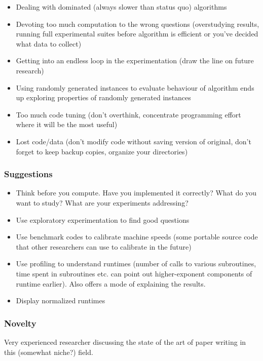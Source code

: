 \begin{itemize}
    \item Dealing with dominated (always slower than status quo) algorithms
    \item Devoting too much computation to the wrong questions (overstudying results, running full experimental suites before algorithm is efficient or you've decided what data to collect)
    \item Getting into an endless loop in the experimentation (draw the line on future research)
    \item Using randomly generated instances to evaluate behaviour of algorithm ends up exploring properties of randomly generated instances
    \item Too much code tuning (don't overthink, concentrate programming effort where it will be the most useful)
    \item Lost code/data (don't modify code without saving version of original, don't forget to keep backup copies, organize your directories)
\end{itemize}

\subsubsection{Suggestions}

\begin{itemize}
    \item Think before you compute. Have you implemented it correctly? What do you want to study? What are your experiments addressing?
    \item Use exploratory experimentation to find good questions
    \item Use benchmark codes to calibrate machine speeds (some portable source code that other researchers can use to calibrate in the future)
    \item Use profiling to understand runtimes (number of calls to various subroutines, time spent in subroutines etc. can point out higher-exponent components of runtime earlier). Also offers a mode of explaining the results.
    \item Display normalized runtimes
\end{itemize}

\subsubsection{Novelty}

Very experienced researcher discussing the state of the art of paper writing in this (somewhat niche?) field.

